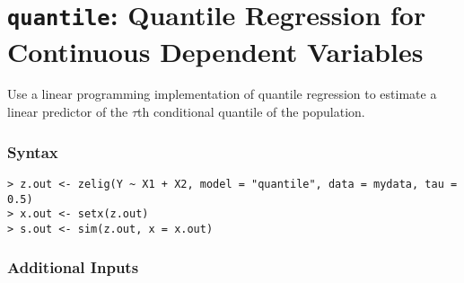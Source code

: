 \section{{\tt quantile}: Quantile Regression for Continuous
Dependent Variables}
\label{ls}

Use a linear programming implementation of quantile regression to
estimate a linear predictor of the $\tau$th conditional quantile of the
population.

\subsubsection{Syntax}

\begin{verbatim}
> z.out <- zelig(Y ~ X1 + X2, model = "quantile", data = mydata, tau = 0.5)
> x.out <- setx(z.out)
> s.out <- sim(z.out, x = x.out)
\end{verbatim}

\subsubsection{Additional Inputs}  

